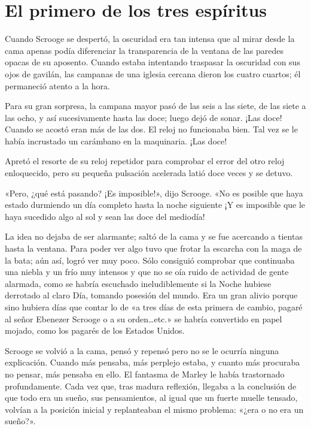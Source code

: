 \documentclass{novela}
\begin{document}
 \chapter{El primero de los tres espíritus}



 Cuando Scrooge se despertó, la oscuridad era tan intensa que al mirar desde la cama apenas podía diferenciar la transparencia de la ventana de las paredes opacas de su aposento. Cuando estaba intentando traspasar la oscuridad con sus ojos de gavilán, las campanas de una iglesia cercana dieron los cuatro cuartos; él permaneció atento a la hora.

 Para su gran sorpresa, la campana mayor pasó de las seis a las siete, de las siete a las ocho, y así sucesivamente hasta las doce; luego dejó de sonar. ¡Las doce! Cuando se acostó eran más de las dos. El reloj no funcionaba bien. Tal vez se le había incrustado un carámbano en la maquinaria. ¡Las doce!

 Apretó el resorte de su reloj repetidor para comprobar el error del otro reloj enloquecido, pero su pequeña pulsación acelerada latió doce veces y se detuvo.

 «Pero, ¿qué está pasando? ¡Es imposible!», dijo Scrooge. «No es posible que haya estado durmiendo un día completo hasta la noche siguiente ¡Y es imposible que le haya sucedido algo al sol y sean las doce del mediodía!

 La idea no dejaba de ser alarmante; saltó de la cama y se fue acercando a tientas hasta la ventana. Para poder ver algo tuvo que frotar la escarcha con la maga de la bata; aún así, logró ver muy poco. Sólo consiguió comprobar que continuaba una niebla y un frío muy intensos y que no se oía ruido de actividad de gente alarmada, como se habría escuchado ineludiblemente si la Noche hubiese derrotado al claro Día, tomando posesión del mundo. Era un gran alivio porque sino hubiera días que contar lo de «a tres días de esta primera de cambio, pagaré al señor Ebenezer Scrooge o a su orden{\ldots}etc.» se habría convertido en papel mojado, como los pagarés de los Estados Unidos.

 Scrooge se volvió a la cama, pensó y repensó pero no se le ocurría ninguna explicación. Cuando más pensaba, más perplejo estaba, y cuanto más procuraba no pensar, más pensaba en ello. El fantasma de Marley le había trastornado profundamente. Cada vez que, tras madura reflexión, llegaba a la conclusión de que todo era un sueño, sus pensamientos, al igual que un fuerte muelle tensado, volvían a la posición inicial y replanteaban el mismo problema: «¿era o no era un sueño?».
\end{document}
